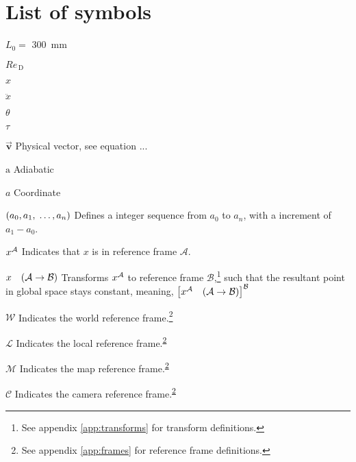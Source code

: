 \chapter{List of symbols}

\begin{Nomencl}[1cm]
    \item[$L_0 = $] \qty{300}{mm}

    \item[$\mathit{Re}_\mathrm{\,D}$]
    \item[$x$]         
    \item[$\ddot{x}$]  \\
    
    \item[$\theta$]    
    \item[$\tau$]      

    \item[$\overrightarrow{\bm{v}}$] Physical vector, see equation ...

    \item[$\mathrm{a}$] Adiabatic
    \item[$a$]          Coordinate

    \item[\((a_0,a_1,\;\dots,a_n)\)] Defines a integer sequence from \(a_0\) to \(a_n\), with a increment of \(a_1-a_0\).
    \item[\(x^\mathcal{A}\)] Indicates that \(x\) is in reference frame \(\mathcal{A}\).
    \item[\(x\transframe{A}{B}\)] Transforms \(x^\mathcal{A}\) to reference frame \(\mathcal{B}\),\footnote{See appendix \ref{app:transforms} for transform definitions.} 
    such that the resultant point in global space stays constant, meaning, \(\left[x\inrefframe{A}\transframe{A}{B}\right]\inrefframe{B}\)
    \item[\(\mathcal{W}\)] Indicates the world reference frame.\footnote{\label{note1}See appendix \ref{app:frames} for reference frame definitions.}
    \item[\(\mathcal{L}\)] Indicates the local reference frame.\textsuperscript{\ref{note1}}
    \item[\(\mathcal{M}\)] Indicates the map reference frame.\textsuperscript{\ref{note1}}
    \item[\(\mathcal{C}\)] Indicates the camera reference frame.\textsuperscript{\ref{note1}}
    
\end{Nomencl}

